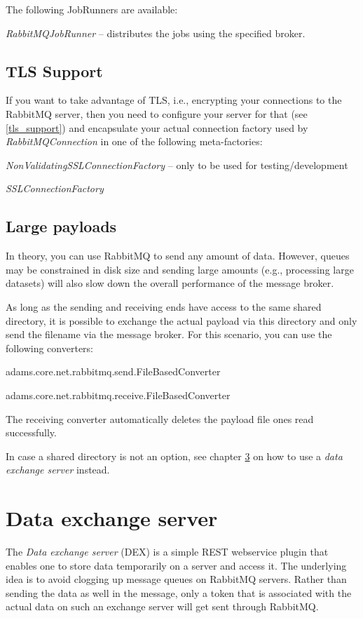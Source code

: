 \documentclass[a4paper]{book}
\begin{document}
\noindent The following JobRunners are available:
\begin{tight_itemize}
  \item \textit{RabbitMQJobRunner} -- distributes the jobs using the specified
  broker.
\end{tight_itemize}

\section{TLS Support}
If you want to take advantage of TLS, i.e., encrypting your connections to
the RabbitMQ server, then you need to configure your server for that (see
\ref{tls_support}) and encapsulate your actual connection factory used by
\textit{RabbitMQConnection} in one of the following meta-factories:
\begin{tight_itemize}
  \item \textit{NonValidatingSSLConnectionFactory} -- only to be used for testing/development
  \item \textit{SSLConnectionFactory}
\end{tight_itemize}

\section{Large payloads}
In theory, you can use RabbitMQ to send any amount of data. However, queues
may be constrained in disk size and sending large amounts (e.g., processing
large datasets) will also slow down the overall performance of the message broker.

As long as the sending and receiving ends have access to the same shared directory,
it is possible to exchange the actual payload via this directory and only send
the filename via the message broker. For this scenario, you can use the following
converters:
\begin{tight_itemize}
  \item adams.core.net.rabbitmq.send.FileBasedConverter
  \item adams.core.net.rabbitmq.receive.FileBasedConverter
\end{tight_itemize}
The receiving converter automatically deletes the payload file ones read
successfully.

In case a shared directory is not an option, see chapter \ref{dex} on how to use
a \textit{data exchange server} instead.


\chapter{Data exchange server}
\label{dex}
The \textit{Data exchange server} (DEX) is a simple REST webservice plugin that enables
one to store data temporarily on a server and access it. The underlying idea is
to avoid clogging up message queues on RabbitMQ servers. Rather than sending the
data as well in the message, only a token that is associated with the actual
data on such an exchange server will get sent through RabbitMQ.
\end{document}
